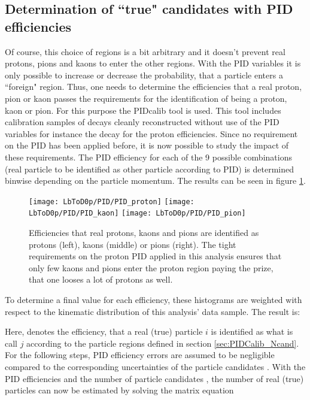 \subsection{Determination of ``true" candidates with PID efficiencies}
Of course, this choice of regions is a bit arbitrary and it doesn't prevent real protons, pions and kaons to enter the other regions.
With the PID variables it is only possible to increase or decrease the probability, that a particle enters a ``foreign" region.
Thus, one needs to determine the efficiencies that a real proton, pion or kaon passes the requirements for the identification of being a proton, kaon or pion.
For this purpose the \lhcb PIDcalib tool is used.
This tool includes calibration samples of decays cleanly reconstructed without use of the PID variables for instance the decay \decay{\Lambda}{\proton\pim} for the proton efficiencies.
Since no requirement on the PID has been applied before, it is now possible to study the impact of these requirements.
The PID efficiency for each of the 9 possible combinations (real particle to be identified as other particle according to PID) is determined binwise depending on the particle momentum. 
The results can be seen in figure \ref{fig:PIDefficiencies}.
\begin{figure}[hptb]
	\centering
	\texttt{[image: LbToD0p/PID/PID\_proton]}
	\texttt{[image: LbToD0p/PID/PID\_kaon]}
	\texttt{[image: LbToD0p/PID/PID\_pion]}
	\caption{Efficiencies that real protons, kaons and pions are identified as protons (left), kaons (middle) or pions (right). The tight requirements on the proton PID applied in this analysis ensures that only few kaons and pions enter the proton region paying the prize, that one looses a lot of
    protons as well.}
	\label{fig:PIDefficiencies}
\end{figure}
To determine a final value for each efficiency, these histograms are weighted with respect to the kinematic distribution of this analysis' data sample. 
The result is:

Here,  denotes the efficiency, that a real (true) particle $i$ is identified as what is call $j$ according to the particle regions defined in section \ref{sec:PIDCalib_Ncand}. 
For the following steps, PID efficiency errors are assumed to be negligible compared to the corresponding uncertainties of the particle candidates .
With the PID efficiencies  and the number of particle candidates , the number of real (true) particles can now be estimated by solving the matrix equation
